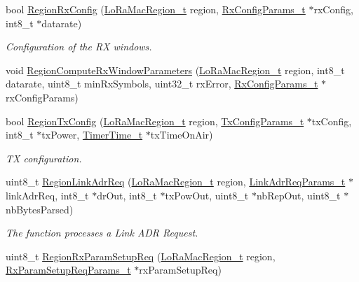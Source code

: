 \begin{DoxyCompactItemize}
bool \mbox{\hyperlink{group___r_e_g_i_o_n_gaf89984d30239d6597190409068031465}{Region\+Rx\+Config}} (\mbox{\hyperlink{group___l_o_r_a_m_a_c_ga80c48efda9ae02e14b58160d34a798dd}{Lo\+Ra\+Mac\+Region\+\_\+t}} region, \mbox{\hyperlink{group___r_e_g_i_o_n_ga375c038078dfcfc7ef14280021db719e}{Rx\+Config\+Params\+\_\+t}} $\ast$rx\+Config, int8\+\_\+t $\ast$datarate)
\begin{DoxyCompactList}\small\item\em Configuration of the RX windows. \end{DoxyCompactList}\item 
void \mbox{\hyperlink{group___r_e_g_i_o_n_gabd3eb4e7db9b7987fabb9568f733a2b9}{Region\+Compute\+Rx\+Window\+Parameters}} (\mbox{\hyperlink{group___l_o_r_a_m_a_c_ga80c48efda9ae02e14b58160d34a798dd}{Lo\+Ra\+Mac\+Region\+\_\+t}} region, int8\+\_\+t datarate, uint8\+\_\+t min\+Rx\+Symbols, uint32\+\_\+t rx\+Error, \mbox{\hyperlink{group___r_e_g_i_o_n_ga375c038078dfcfc7ef14280021db719e}{Rx\+Config\+Params\+\_\+t}} $\ast$rx\+Config\+Params)
\item 
bool \mbox{\hyperlink{group___r_e_g_i_o_n_ga9a4b01301e0f6f6880dc6a651c062ad0}{Region\+Tx\+Config}} (\mbox{\hyperlink{group___l_o_r_a_m_a_c_ga80c48efda9ae02e14b58160d34a798dd}{Lo\+Ra\+Mac\+Region\+\_\+t}} region, \mbox{\hyperlink{group___r_e_g_i_o_n_gabed730d4d04b0b60d4b6d1966d3f21d3}{Tx\+Config\+Params\+\_\+t}} $\ast$tx\+Config, int8\+\_\+t $\ast$tx\+Power, \mbox{\hyperlink{utilities_8h_a4215ca43d3e953099ea758ce428599d0}{Timer\+Time\+\_\+t}} $\ast$tx\+Time\+On\+Air)
\begin{DoxyCompactList}\small\item\em TX configuration. \end{DoxyCompactList}\item 
uint8\+\_\+t \mbox{\hyperlink{group___r_e_g_i_o_n_gae82a94e6d4141122e1a20b5ba1936c8e}{Region\+Link\+Adr\+Req}} (\mbox{\hyperlink{group___l_o_r_a_m_a_c_ga80c48efda9ae02e14b58160d34a798dd}{Lo\+Ra\+Mac\+Region\+\_\+t}} region, \mbox{\hyperlink{group___r_e_g_i_o_n_gad4af503e8d4de1846129e26a799a1e8e}{Link\+Adr\+Req\+Params\+\_\+t}} $\ast$link\+Adr\+Req, int8\+\_\+t $\ast$dr\+Out, int8\+\_\+t $\ast$tx\+Pow\+Out, uint8\+\_\+t $\ast$nb\+Rep\+Out, uint8\+\_\+t $\ast$nb\+Bytes\+Parsed)
\begin{DoxyCompactList}\small\item\em The function processes a Link A\+DR Request. \end{DoxyCompactList}\item 
uint8\+\_\+t \mbox{\hyperlink{group___r_e_g_i_o_n_ga485a820155fded42235a0d14d5918a7d}{Region\+Rx\+Param\+Setup\+Req}} (\mbox{\hyperlink{group___l_o_r_a_m_a_c_ga80c48efda9ae02e14b58160d34a798dd}{Lo\+Ra\+Mac\+Region\+\_\+t}} region, \mbox{\hyperlink{group___r_e_g_i_o_n_ga7165f282c670c728c36d534df2285157}{Rx\+Param\+Setup\+Req\+Params\+\_\+t}} $\ast$rx\+Param\+Setup\+Req)

\end{DoxyCompactItemize}
